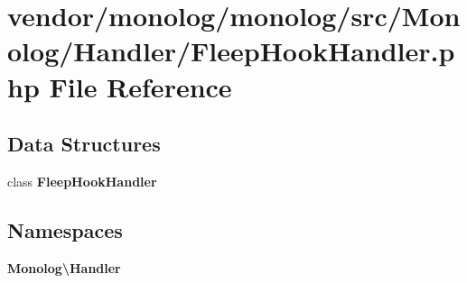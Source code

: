 \section{vendor/monolog/monolog/src/\+Monolog/\+Handler/\+Fleep\+Hook\+Handler.php File Reference}
\label{_fleep_hook_handler_8php}
\subsection*{Data Structures}
\begin{DoxyCompactItemize}
\item 
class {\bf Fleep\+Hook\+Handler}
\end{DoxyCompactItemize}
\subsection*{Namespaces}
\begin{DoxyCompactItemize}
\item 
 {\bf Monolog\textbackslash{}\+Handler}
\end{DoxyCompactItemize}

